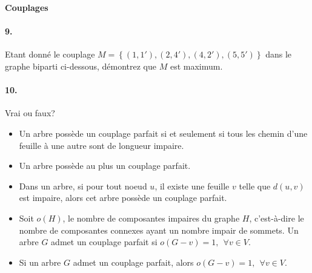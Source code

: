 \newpage

\textbf{Couplages}

\paragraph{9. } Etant donné le couplage $M = \left\lbrace  (1,1'), (2,4'),(4,2'),(5,5')  \right\rbrace$ dans le graphe biparti ci-dessous, démontrez que $M$ est maximum.

\begin{figure}[h!]
  \begin{center}
  \end{center}
\end{figure}


\paragraph{10. } Vrai ou faux? \\
\begin{itemize}
  \item Un arbre possède un couplage parfait si et seulement si tous les chemin d'une feuille à une autre sont de longueur impaire.
  \item Un arbre possède au plus un couplage parfait.
  \item Dans un arbre, si pour tout noeud $u$, il existe une feuille $v$ telle que $d(u,v)$ est impaire, alors cet arbre possède un couplage parfait.
  \item Soit $o(H)$, le nombre de composantes impaires du graphe $H$, c'est-à-dire le nombre de composantes connexes ayant un nombre impair de sommets. Un arbre $G$ admet un couplage parfait si $o(G-v)=1,  \ \ \forall v \in V$.
  \item Si un arbre $G$ admet un couplage parfait, alors $o(G-v)=1, \ \ \forall v \in V$.
\end{itemize}



